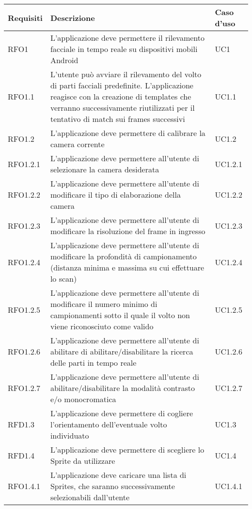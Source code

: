 \begin{center}
    \begin{longtable}{ | p{2cm} | p{7cm} | p{2cm} |}
    \hline
    Requisiti & Descrizione & Caso d'uso \\ \hline
    RFO1 &  L'applicazione deve permettere il rilevamento facciale in tempo reale su dispositivi mobili Android & UC1  \\ \hline 
    RFO1.1 &  L'utente può avviare il rilevamento del volto di parti facciali predefinite. L'applicazione reagisce con la creazione di templates che verranno successivamente riutilizzati per il tentativo di match sui frames successivi  & UC1.1 \\ \hline
    RFO1.2 &  L'applicazione deve permettere di calibrare la camera corrente  & UC1.2  \\ \hline 
    RFO1.2.1 &  L'applicazione deve permettere all'utente di selezionare la camera desiderata & UC1.2.1  \\ \hline
    RFO1.2.2 &  L'applicazione deve permettere all'utente di modificare il tipo di elaborazione della camera & UC1.2.2  \\ \hline
    RFO1.2.3 &  L'applicazione deve permettere all'utente di modificare la risoluzione del frame in ingresso & UC1.2.3  \\ \hline
    RFO1.2.4 &  L'applicazione deve permettere all'utente di modificare la profondità di campionamento (distanza minima e massima su cui effettuare lo scan) & UC1.2.4  \\ \hline
    RFO1.2.5 &  L'applicazione deve permettere all'utente di modificare il numero minimo di campionamenti sotto il quale il volto non viene riconosciuto come valido  & UC1.2.5  \\ \hline
    RFO1.2.6 &  L'applicazione deve permettere all'utente di abilitare di abilitare/disabilitare la ricerca delle parti in tempo reale  & UC1.2.6  \\ \hline
    RFO1.2.7 &  L'applicazione deve permettere all'utente di abilitare/disabilitare la modalità contrasto e/o monocromatica  & UC1.2.7  \\ \hline
    RFD1.3 &  L'applicazione deve permettere di cogliere l'orientamento dell'eventuale volto individuato & UC1.3 \\ \hline    
    RFD1.4 &  L'applicazione deve permettere di scegliere lo Sprite da utilizzare & UC1.4 \\ \hline
    RFO1.4.1 &  L'applicazione deve caricare una lista di Sprites, che saranno successivamente selezionabili dall'utente & UC1.4.1  \\ \hline

\end{longtable}
\end{center}
